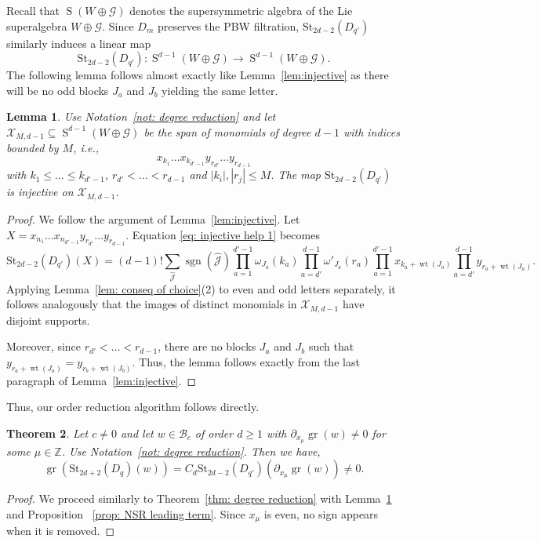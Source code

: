 \documentclass[12pt]{amsart}
\theoremstyle{plain}
\newtheorem{theorem}{Theorem}[section]
\newtheorem{lemma}[theorem]{Lemma}
\theoremstyle{definition}
\numberwithin{equation}{theorem}
\newcommand{\Sa}{\operatorname{S}}
\newcommand{\sgn}{\operatorname{sgn}}
\newcommand{\gr}{\operatorname{gr}}
\newcommand{\ZZ}{\mathbb{Z}}
\newcommand{\mc}[1]{\mathcal{#1}}
\newcommand{\calB}{\mathcal B}
\newcommand{\St}{\mathrm{St}}
\newcommand{\length}[1]{\left\lvert #1\right\rvert}
\newcommand{\wt}{\operatorname{wt}}
\begin{document}
Recall that $\Sa(W \oplus \mc{G})$ denotes the supersymmetric algebra of the Lie superalgebra $W \oplus \mc{G}$. Since $D_m$ preserves the PBW filtration, $\St_{2d-2}(D_{q'})$ similarly induces a linear map 
\[\St_{2d-2}(D_{q'}): \Sa^{d-1}(W \oplus \mc{G}) \to \Sa^{d-1}(W \oplus \mc{G}).\]
The following lemma follows almost exactly like Lemma~\ref{lem:injective} as there will be no odd blocks $J_a$ and $J_b$ yielding the same letter. 
\begin{lemma}\label{lem: NSR injective}
    Use Notation~\ref{not: degree reduction} and let $\mc{X}_{M,d-1} \subseteq \Sa^{d-1}(W \oplus \mc{G})$ be the span of monomials of degree $d-1$ with indices bounded by $M$, i.e.,  
    \[ x_{k_1} \dots x_{k_{d'-1}} y_{r_{d'}} \dots y_{r_{d-1}}  \]
    with $k_1 \leq \dots \leq k_{d'-1}$, $r_{d'} < \dots < r_{d-1}$ and $\length{k_i},\length{r_j} \leq M$. 
    The map $\St_{2d-2}(D_{q'})$ is injective on $\mc{X}_{M, d-1}$.
\end{lemma}
\begin{proof}
    We follow the argument of Lemma~\ref{lem:injective}. Let $X= x_{n_1} \dots x_{n_{d'-1}} y_{r_{d'}} \dots y_{r_{d-1}}$. Equation \eqref{eq: injective help 1} becomes
    \begin{equation*}\label{eq: NSR injective help 1}
        \St_{2d-2}(D_{q'})(X) = (d-1)! \sum_{\widehat{\mc{J}}} \sgn(\widehat{\mc{J}}) \prod_{a=1}^{d'-1}\omega_{J_a}(k_a)  \prod_{a=d'}^{d-1}\omega'_{J_a}(r_a) \prod_{a=1}^{d'-1} x_{k_a + \wt(J_a)}\prod_{a=d'}^{d-1} y_{r_a + \wt(J_a)}.
    \end{equation*}
    Applying Lemma~\ref{lem: conseq of choice}(2) to even and odd letters separately, it follows analogously that the images of distinct monomials in $\mc X_{M,d-1}$ have disjoint supports.

    Moreover, since $r_{d'} < \dots < r_{d-1}$, there are no blocks $J_a$ and $J_b$ such that $y_{r_a + \wt(J_a)} = y_{r_b + \wt(J_b)}$. Thus, the lemma follows exactly from the last paragraph of Lemma~\ref{lem:injective}.
\end{proof}

Thus, our order reduction algorithm follows directly.
\begin{theorem}\label{thm: NSR degree reduction}
    Let $c \neq 0$ and let $w \in \calB_c$ of order $d \geq 1$ with $\partial_{x_{\mu}} \gr(w) \neq 0$ for some $\mu \in \ZZ$. Use Notation~\ref{not: degree reduction}. Then we have, 
    \[\gr( \St_{2d+2} (D_q) (w) ) = C_d \St_{2d-2}(D_{q'})(\partial_{x_\mu} \gr(w)) \neq 0.\]
\end{theorem}
\begin{proof}
    We proceed similarly to Theorem~\ref{thm: degree reduction} with Lemma~\ref{lem: NSR injective} and Proposition ~\ref{prop: NSR leading term}. Since $x_\mu$ is even, no sign appears when it is removed.
\end{proof}
\end{document}
